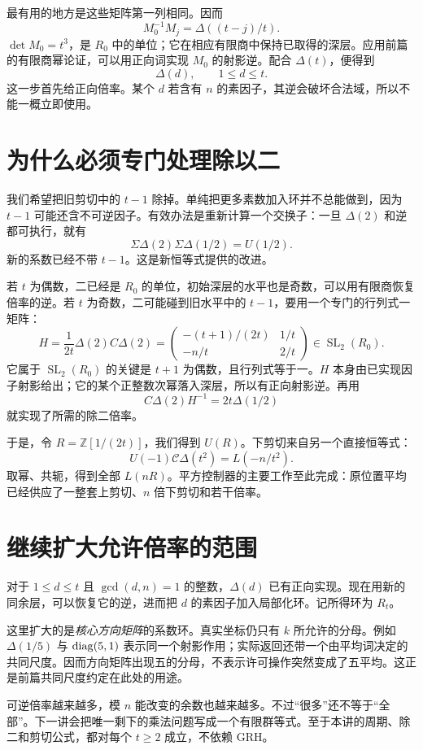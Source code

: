 \documentclass[11pt,a4paper,oneside,openany]{book}
\newcommand{\Z}{\mathbb Z}\newcommand{\Q}{\mathbb Q}\newcommand{\F}{\mathbb F}\newcommand{\CC}{\mathbb C}
\newcommand{\SL}{\operatorname{SL}}\newcommand{\GL}{\operatorname{GL}}
\theoremstyle{definition}\newtheorem{example}[theorem]{例}\newtheorem{conjecture}[theorem]{猜想}
\numberwithin{equation}{chapter}\setcounter{tocdepth}{1}
\begin{document}
最有用的地方是这些矩阵第一列相同。因而
\[M_0^{-1}M_j=\Delta((t-j)/t).
\]
$\det M_0=t^3$，是 $R_0$ 中的单位；它在相应有限商中保持已取得的深层。应用前篇的有限商幂论证，可以用正向词实现 $M_0$ 的射影逆。配合 $\Delta(t)$，便得到
\[\Delta(d),\qquad 1\le d\le t.
\]
这一步首先给正向倍率。某个 $d$ 若含有 $n$ 的素因子，其逆会破坏合法域，所以不能一概立即使用。

\section{为什么必须专门处理除以二}
我们希望把旧剪切中的 $t-1$ 除掉。单纯把更多素数加入环并不总能做到，因为 $t-1$ 可能还含不可逆因子。有效办法是重新计算一个交换子：一旦 $\Delta(2)$ 和逆都可执行，就有
\[\Sigma\Delta(2)\Sigma\Delta(1/2)=U(1/2).
\]
新的系数已经不带 $t-1$。这是新恒等式提供的改进。

若 $t$ 为偶数，二已经是 $R_0$ 的单位，初始深层的水平也是奇数，可以用有限商恢复倍率的逆。若 $t$ 为奇数，二可能碰到旧水平中的 $t-1$，要用一个专门的行列式一矩阵：
\[
H=\frac1{2t}\Delta(2)C\Delta(2)
=\begin{pmatrix}
-(t+1)/(2t)&1/t\\-n/t&2/t
\end{pmatrix}\in\SL_2(R_0).
\]
它属于 $\SL_2(R_0)$ 的关键是 $t+1$ 为偶数，且行列式等于一。$H$ 本身由已实现因子射影给出；它的某个正整数次幂落入深层，所以有正向射影逆。再用
\[C\Delta(2)H^{-1}=2t\Delta(1/2)
\]
就实现了所需的除二倍率。

于是，令 $R=\Z[1/(2t)]$，我们得到 $U(R)$。下剪切来自另一个直接恒等式：
\[U(-1)\mathcal C\Delta(t^2)=L(-n/t^2).
\]
取幂、共轭，得到全部 $L(nR)$。平方控制器的主要工作至此完成：原位置平均已经供应了一整套上剪切、$n$ 倍下剪切和若干倍率。

\section{继续扩大允许倍率的范围}
对于 $1\le d\le t$ 且 $\gcd(d,n)=1$ 的整数，$\Delta(d)$ 已有正向实现。现在用新的同余层，可以恢复它的逆，进而把 $d$ 的素因子加入局部化环。记所得环为 $R_t$。

这里扩大的是\emph{核心方向矩阵}的系数环。真实坐标仍只有 $k$ 所允许的分母。例如 $\Delta(1/5)$ 与 $\operatorname{diag}(5,1)$ 表示同一个射影作用；实际返回还带一个由平均词决定的共同尺度。因而方向矩阵出现五的分母，不表示许可操作突然变成了五平均。这正是前篇共同尺度约定在此处的用途。

可逆倍率越来越多，模 $n$ 能改变的余数也越来越多。不过“很多”还不等于“全部”。下一讲会把唯一剩下的乘法问题写成一个有限群等式。至于本讲的周期、除二和剪切公式，都对每个 $t\ge2$ 成立，不依赖 GRH。
\end{document}
